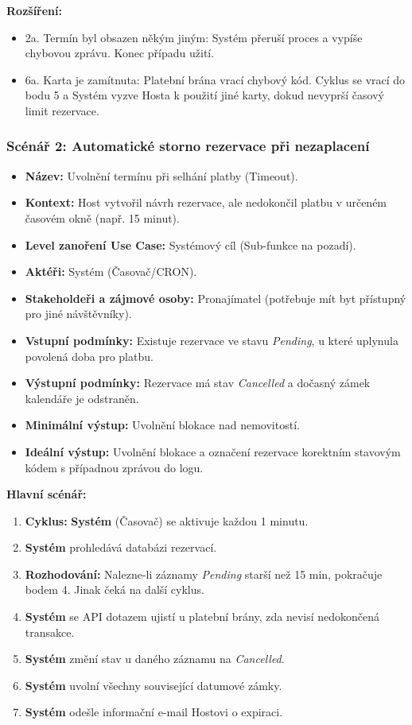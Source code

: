 \documentclass[11pt, a4paper]{article}
\begin{document}
\noindent \textbf{Rozšíření:}
\begin{itemize}
    \item 2a. Termín byl obsazen někým jiným: Systém přeruší proces a vypíše chybovou zprávu. Konec případu užití.
    \item 6a. Karta je zamítnuta: Platební brána vrací chybový kód. Cyklus se vrací do bodu 5 a Systém vyzve Hosta k použití jiné karty, dokud nevyprší časový limit rezervace.
\end{itemize}

\vspace{0.5cm}
\subsubsection{Scénář 2: Automatické storno rezervace při nezaplacení}
\begin{itemize}[leftmargin=*]
    \item \textbf{Název:} Uvolnění termínu při selhání platby (Timeout).
    \item \textbf{Kontext:} Host vytvořil návrh rezervace, ale nedokončil platbu v určeném časovém okně (např. 15 minut).
    \item \textbf{Level zanoření Use Case:} Systémový cíl (Sub-funkce na pozadí).
    \item \textbf{Aktéři:} Systém (Časovač/CRON).
    \item \textbf{Stakeholdeři a zájmové osoby:} Pronajímatel (potřebuje mít byt přístupný pro jiné návštěvníky).
    \item \textbf{Vstupní podmínky:} Existuje rezervace ve stavu \textit{Pending}, u které uplynula povolená doba pro platbu.
    \item \textbf{Výstupní podmínky:} Rezervace má stav \textit{Cancelled} a dočasný zámek kalendáře je odstraněn.
    \item \textbf{Minimální výstup:} Uvolnění blokace nad nemovitostí.
    \item \textbf{Ideální výstup:} Uvolnění blokace a označení rezervace korektním stavovým kódem s případnou zprávou do logu.
\end{itemize}

\noindent \textbf{Hlavní scénář:}
\begin{enumerate}
    \item \textbf{Cyklus:} \textbf{Systém} (Časovač) se aktivuje každou 1 minutu.
    \item \textbf{Systém} prohledává databázi rezervací.
    \item \textbf{Rozhodování:} Nalezne-li záznamy \textit{Pending} starší než 15 min, pokračuje bodem 4. Jinak čeká na další cyklus.
    \item \textbf{Systém} se API dotazem ujistí u platební brány, zda nevisí nedokončená transakce.
    \item \textbf{Systém} změní stav u daného záznamu na \textit{Cancelled}.
    \item \textbf{Systém} uvolní všechny související datumové zámky.
    \item \textbf{Systém} odešle informační e-mail Hostovi o expiraci.
\end{enumerate}
\end{document}
